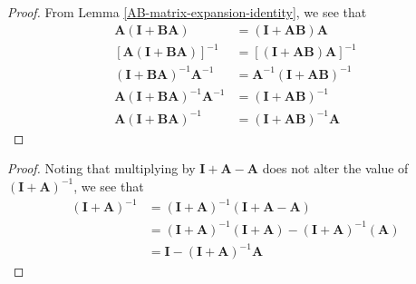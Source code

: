 \begin{proof}
From Lemma \ref{AB-matrix-expansion-identity}, we see that
\begin{equation*}
    \begin{aligned}
        \mathbf{A} \left( \mathbf{I} + \mathbf{B} \mathbf{A} \right)
        &= \left( \mathbf{I} + \mathbf{A} \mathbf{B} \right) \mathbf{A} \\
        \left[ \mathbf{A} \left( \mathbf{I} + \mathbf{B} \mathbf{A} \right) \right]^{-1}
        &= \left[ \left( \mathbf{I} + \mathbf{A} \mathbf{B} \right) \mathbf{A} \right]^{-1} \\
        \left( \mathbf{I} + \mathbf{B} \mathbf{A} \right)^{-1} \mathbf{A}^{-1}
        &= \mathbf{A}^{-1} \left( \mathbf{I} + \mathbf{A} \mathbf{B} \right)^{-1} \\
        \mathbf{A} \left( \mathbf{I} + \mathbf{B} \mathbf{A} \right)^{-1} \mathbf{A}^{-1}
        &= \left( \mathbf{I} + \mathbf{A} \mathbf{B} \right)^{-1} \\
        \mathbf{A} \left( \mathbf{I} + \mathbf{B} \mathbf{A} \right)^{-1}
        &= \left( \mathbf{I} + \mathbf{A} \mathbf{B} \right)^{-1} \mathbf{A}
    \end{aligned}
\end{equation*}
\end{proof}


\begin{proof}
Noting that multiplying by $\mathbf{I} + \mathbf{A} - \mathbf{A}$ does not alter the value
of $\left( \mathbf{I} + \mathbf{A} \right)^{-1}$, we see that
\begin{equation*}
    \begin{aligned}
        \left( \mathbf{I} + \mathbf{A} \right)^{-1}
        &= \left( \mathbf{I} + \mathbf{A} \right)^{-1} \left( \mathbf{I} + \mathbf{A} - \mathbf{A} \right) \\
        &= \left( \mathbf{I} + \mathbf{A} \right)^{-1} \left( \mathbf{I} + \mathbf{A} \right)
        - \left( \mathbf{I} + \mathbf{A} \right)^{-1} \left( \mathbf{A} \right) \\
        &= \mathbf{I} - \left( \mathbf{I} + \mathbf{A} \right)^{-1} \mathbf{A}
    \end{aligned}
\end{equation*}
\end{proof}

